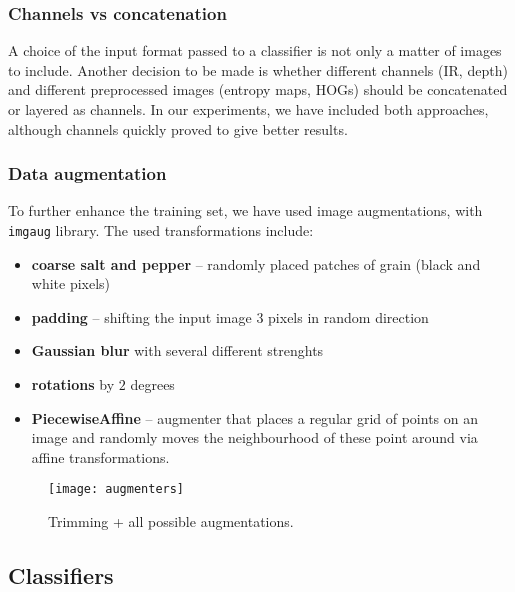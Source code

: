         \subsubsection*{Channels vs concatenation}
        A choice of the input format passed to a classifier is not only a matter
        of images to include. Another decision to be made is whether different
        channels (IR, depth) and different preprocessed images (entropy maps,
        HOGs) should be concatenated or layered as channels. In our experiments,
        we have included both approaches, although channels quickly proved to
        give better results.

        \subsubsection*{Data augmentation}
        To further enhance the training set, we have used image augmentations, with \texttt{imgaug}\cite{imgaug} library.
        The used transformations include:
        \begin{itemize}
            \item \textbf{coarse salt and pepper} -- randomly placed patches of grain (black and white pixels)
            \item \textbf{padding} -- shifting the input image $3$ pixels in random direction
            \item \textbf{Gaussian blur} with several different strenghts
            \item \textbf{rotations} by $2$ degrees
            \item \textbf{PiecewiseAffine} -- augmenter that places a regular grid of points on an image and randomly moves the neighbourhood of these point around via affine transformations.
        \end{itemize}
        \begin{figure}[H]
        \caption{Trimming + all possible augmentations.}
        \centering
        \texttt{[image: augmenters]}
        \end{figure}

    \subsection{Classifiers}
